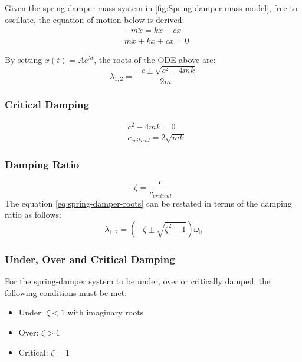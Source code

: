 Given the spring-damper mass system in \cref{fig:Spring-damper mass model}, free to oscillate, the equation of motion below is derived: 
\begin{equation}
\begin{aligned}
&-m\ddot{x} = kx + c\dot{x}\\
&m\ddot{x} + kx + c\dot{x} = 0
\end{aligned}
\end{equation}

By setting $x(t) = Ae^{\lambda t}$, the roots of the ODE above are:
\begin{equation} \label{eq:spring-damper-roots}
\lambda_{1,2} = \frac{-c \pm \sqrt{c^2 - 4mk}}{2m}
\end{equation}

\subsubsection{Critical Damping}
\begin{equation}
\begin{aligned}
&c^2 - 4mk = 0 \\
&c_{critical} = 2\sqrt{mk}
\end{aligned}
\end{equation}

\subsubsection{Damping Ratio}
\begin{equation}
\zeta = \frac{c}{c_{critical}}
\end{equation}
The equation \cref{eq:spring-damper-roots} can be restated in terms of the damping ratio as follows:
\begin{equation}
\lambda_{1,2} = (-\zeta \pm \sqrt{\zeta^2 - 1})\omega_0
\end{equation}

\subsubsection{Under, Over and Critical Damping}
For the spring-damper system to be under, over or critically damped, the following conditions must be met:
\begin{itemize}
\item Under: $\zeta < 1$ with imaginary roots
\item Over: $\zeta > 1$ 
\item Critical: $\zeta = 1$
\end{itemize}

